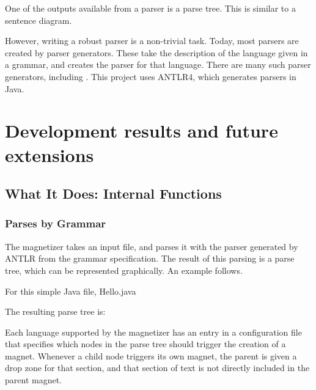 \documentclass[letter,10pt]{article}
\begin{document}

One of the outputs available from a parser is a parse tree. This is 
similar to a sentence diagram. 

However, writing a robust parser is a non-trivial task. Today, most 
parsers are created by parser generators. These take the description of 
the language given in a grammar, and creates the parser for that 
language. There are many such parser generators, including . This project uses ANTLR4, which generates 
parsers in Java.  

\section{Development results and future extensions}

\subsection{What It Does: Internal Functions}

\subsubsection{Parses by Grammar}

The magnetizer  takes an input 
file, and parses it with the parser generated by ANTLR from the grammar 
specification. The result of this parsing is a parse tree, which can 
be represented graphically. An example follows.

For this simple Java file, Hello.java

The resulting parse tree is:

\label{fig:parseTree}

Each language supported by the magnetizer has an entry in a 
configuration file that specifies which nodes in the parse tree should 
trigger the creation of a magnet. Whenever a child node triggers its 
own magnet, the parent is given a drop zone for that section, and that 
section of text is not directly included in the parent magnet.


\end{document}
